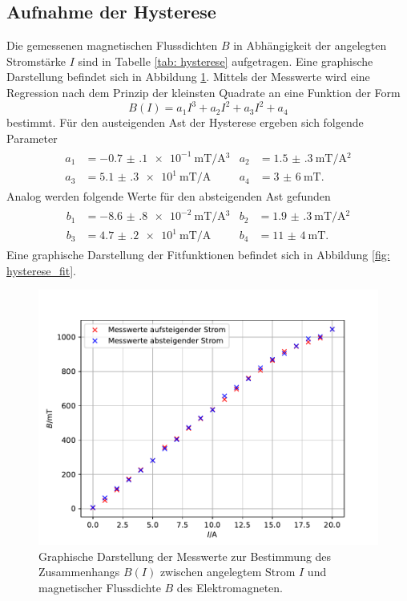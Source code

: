 \subsection{Aufnahme der Hysterese}
Die gemessenen magnetischen Flussdichten $B$ in Abhängigkeit der angelegten Stromstärke $I$
sind in Tabelle \ref{tab: hysterese} aufgetragen. Eine graphische Darstellung befindet sich in Abbildung
\ref{fig: hysterese_gesamt}. Mittels der Messwerte wird eine Regression nach dem Prinzip der kleinsten Quadrate
an eine Funktion der Form
\begin{equation}
  B(I) = a_1 I^3 + a_2 I^2 + a_3 I ^2 + a_4
  \label{eq: fitfuntion_hysterese}
\end{equation}
bestimmt. Für den austeigenden Ast der Hysterese ergeben sich folgende Parameter
\begin{align}
  \begin{aligned}
    a_1 &= \SI{-0.7(1)e-1}{\milli\tesla \per \ampere ^3} & a_2 &= \SI{1.5(3)}{\milli\tesla \per \ampere ^2} \\
    a_3 &= \SI{5.1(3)e1}{\milli\tesla \per \ampere } & a_4 &= \SI{3(6)}{\milli\tesla }.
    \label{eq: params_up}
  \end{aligned}
\end{align}
Analog werden folgende Werte für den absteigenden Ast gefunden
\begin{align}
  \begin{aligned}
    b_1 &= \SI{-8.6(8)e-2}{\milli\tesla \per \ampere ^3} & b_2 &= \SI{1.9(3)}{\milli\tesla \per \ampere ^2} \\
    b_3 &= \SI{4.7(2)e1}{\milli\tesla \per \ampere } & b_4 &= \SI{11(4)}{\milli\tesla }.
  \end{aligned}
\end{align}
Eine graphische Darstellung der Fitfunktionen befindet sich in Abbildung \ref{fig: hysterese_fit}.

\begin{figure}
  \centering
  \includegraphics[width = \textwidth]{../Messdaten/plots/hysterese_data.pdf}
  \caption{Graphische Darstellung der Messwerte zur Bestimmung des Zusammenhangs $B(I)$ zwischen angelegtem Strom $I$ und
  magnetischer Flussdichte $B$ des Elektromagneten.}
  \label{fig: hysterese_gesamt}
\end{figure}
